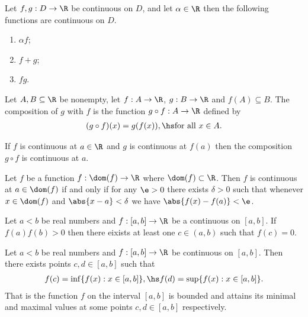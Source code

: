 \documentclass{article}
\begin{document}
\begin{theorem}[Notes 1.10]
    Let $f,g:D\to\R$ be continuous on $D$, and let $\alpha\in\R$ then the following functions
    are continuous on $D$. 
    \begin{enumerate}
        \item $\alpha f$;
        \item $f+g$;
        \item $fg$.
    \end{enumerate} 
\end{theorem}

\begin{definition}[Notes 1.8]
    Let $A,B\subseteq\R$ be nonempty, let $f:A\to\R$, $g:B\to\R$ and $f(A)\subseteq B$. The
    composition of $g$ with $f$ is the function $g\circ f:A\to\R$ defined by
    \begin{align*}
        (g\circ f)(x) = g(f(x)),\hs \text{for all }x\in A.
    \end{align*} 
\end{definition}

\begin{theorem}[Notes 1.11]
    If $f$ is continuous at $a\in\R$ and $g$ is continuous at $f(a)$ then the composition 
    $g\circ f$ is continuous at $a$.
\end{theorem}

\begin{theorem}[Notes 1.12]
    Let $f$ be a function $f:\dom(f)\to\R$ where $\dom(f)\subset\R$. Then $f$ is continuous
    at $a\in\dom(f)$ if and only if for any $\e>0$ there exists $\delta>0$ such that
    whenever $x\in\dom(f)$ and $\abs{x-a}<\delta$ we have $\abs{f(x)-f(a)}<\e$. 
\end{theorem}

\begin{theorem}
    Let $a<b$ be real numbers and $f:[a,b]\to\R$ be a continuous on $[a,b]$.
    If $f(a)f(b)>0$ then there eixists at least one $c\in(a,b)$ such that $f(c)=0$. 
\end{theorem}

\begin{theorem}
    Let $a<b$ be real numbers and $f:[a,b]\to\R$ be continuous on $[a,b]$. Then
    there exists points $c,d\in[a,b]$ such that
    \begin{align*}
        f(c) = \inf\{f(x):x\in[a,b]\},\hs f(d)=\sup\{f(x):x\in[a,b]\}.
    \end{align*} 
    That is the function $f$ on the interval $[a,b]$ is bounded and attains its minimal
    and maximal values at some points $c,d\in[a,b]$ respectively.
\end{theorem}
\end{document}
